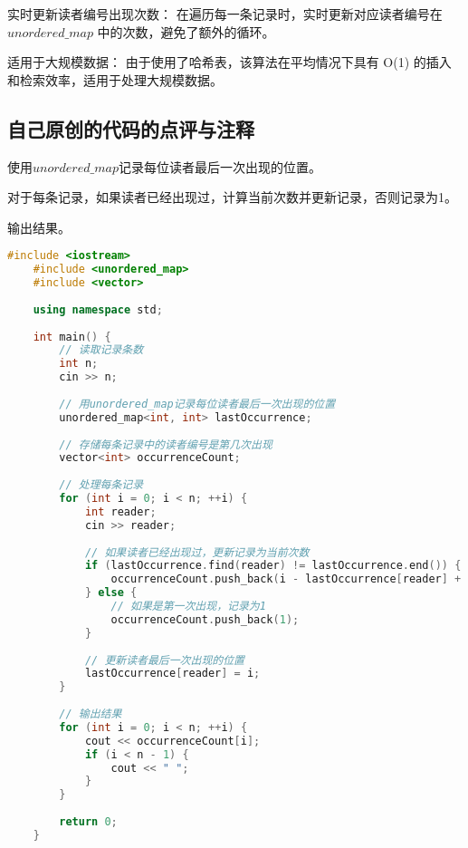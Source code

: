 实时更新读者编号出现次数： 在遍历每一条记录时，实时更新对应读者编号在 $unordered\_map$ 中的次数，避免了额外的循环。

适用于大规模数据： 由于使用了哈希表，该算法在平均情况下具有 O(1) 的插入和检索效率，适用于处理大规模数据。

\subsection{自己原创的代码的点评与注释}

使用$unordered\_map$记录每位读者最后一次出现的位置。

对于每条记录，如果读者已经出现过，计算当前次数并更新记录，否则记录为1。

输出结果。

\begin{lstlisting}[language=C++]
    #include <iostream>
    #include <unordered_map>
    #include <vector>
    
    using namespace std;
    
    int main() {
        // 读取记录条数
        int n;
        cin >> n;
    
        // 用unordered_map记录每位读者最后一次出现的位置
        unordered_map<int, int> lastOccurrence;
    
        // 存储每条记录中的读者编号是第几次出现
        vector<int> occurrenceCount;
    
        // 处理每条记录
        for (int i = 0; i < n; ++i) {
            int reader;
            cin >> reader;
    
            // 如果读者已经出现过，更新记录为当前次数
            if (lastOccurrence.find(reader) != lastOccurrence.end()) {
                occurrenceCount.push_back(i - lastOccurrence[reader] + 1);
            } else {
                // 如果是第一次出现，记录为1
                occurrenceCount.push_back(1);
            }
    
            // 更新读者最后一次出现的位置
            lastOccurrence[reader] = i;
        }
    
        // 输出结果
        for (int i = 0; i < n; ++i) {
            cout << occurrenceCount[i];
            if (i < n - 1) {
                cout << " ";
            }
        }
    
        return 0;
    }    
\end{lstlisting}